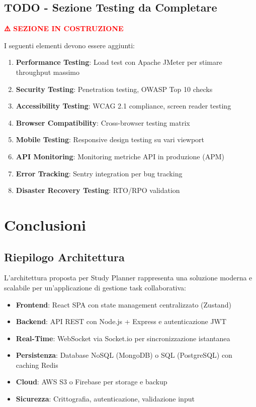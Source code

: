 \documentclass[12pt,a4paper]{report}
\begin{document}
\section{TODO - Sezione Testing da Completare}

\textcolor{red}{\textbf{⚠️ SEZIONE IN COSTRUZIONE}}

I seguenti elementi devono essere aggiunti:

\begin{enumerate}
    \item \textbf{Performance Testing}: Load test con Apache JMeter per stimare throughput massimo
    \item \textbf{Security Testing}: Penetration testing, OWASP Top 10 checks
    \item \textbf{Accessibility Testing}: WCAG 2.1 compliance, screen reader testing
    \item \textbf{Browser Compatibility}: Cross-browser testing matrix
    \item \textbf{Mobile Testing}: Responsive design testing su vari viewport
    \item \textbf{API Monitoring}: Monitoring metriche API in produzione (APM)
    \item \textbf{Error Tracking}: Sentry integration per bug tracking
    \item \textbf{Disaster Recovery Testing}: RTO/RPO validation
\end{enumerate}

\newpage

\chapter{Conclusioni}

\section{Riepilogo Architettura}

L'architettura proposta per Study Planner rappresenta una soluzione moderna e scalabile per un'applicazione di gestione task collaborativa:

\begin{itemize}
    \item \textbf{Frontend}: React SPA con state management centralizzato (Zustand)
    \item \textbf{Backend}: API REST con Node.js + Express e autenticazione JWT
    \item \textbf{Real-Time}: WebSocket via Socket.io per sincronizzazione istantanea
    \item \textbf{Persistenza}: Database NoSQL (MongoDB) o SQL (PostgreSQL) con caching Redis
    \item \textbf{Cloud}: AWS S3 o Firebase per storage e backup
    \item \textbf{Sicurezza}: Crittografia, autenticazione, validazione input
\end{itemize}
\end{document}
